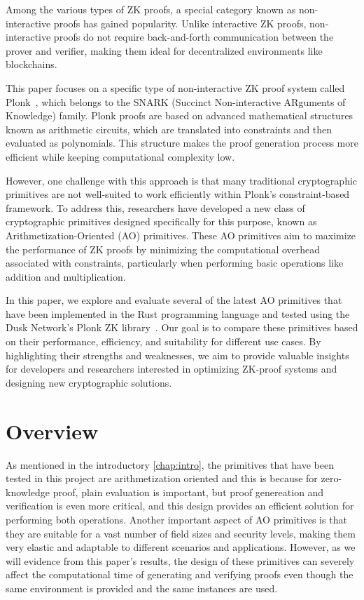 \documentclass[12pt, a4paper]{report}
\begin{document}
Among the various types of ZK proofs, a special category known as non-interactive proofs has gained popularity. Unlike interactive ZK proofs, non-interactive proofs do not require back-and-forth communication between the prover and verifier, making them ideal for decentralized environments like blockchains.

This paper focuses on a specific type of non-interactive ZK proof system called \textsf{Plonk}~\cite{plonk}, which belongs to the SNARK (Succinct Non-interactive ARguments of Knowledge) family. \textsf{Plonk} proofs are based on advanced mathematical structures known as arithmetic circuits, which are translated into constraints and then evaluated as polynomials. This structure makes the proof generation process more efficient while keeping computational complexity low.

However, one challenge with this approach is that many traditional cryptographic primitives are not well-suited to work efficiently within \textsf{Plonk}'s constraint-based framework. To address this, researchers have developed a new class of cryptographic primitives designed specifically for this purpose, known as Arithmetization-Oriented (AO) primitives. These AO primitives aim to maximize the performance of ZK proofs by minimizing the computational overhead associated with constraints, particularly when performing basic operations like addition and multiplication.

In this paper, we explore and evaluate several of the latest AO primitives that have been implemented in the Rust programming language and tested using the Dusk Network's \textsf{Plonk} ZK library~\cite{dusk-plonk}. Our goal is to compare these primitives based on their performance, efficiency, and suitability for different use cases. By highlighting their strengths and weaknesses, we aim to provide valuable insights for developers and researchers interested in optimizing ZK-proof systems and designing new cryptographic solutions.

\chapter{Overview}\label{chap:overview}

As mentioned in the introductory \autoref{chap:intro}, the primitives that have been tested in this project are arithmetization oriented and this is because for zero-knowledge proof, plain evaluation is important, but proof genereation and verification is even more critical, and this design provides an efficient solution for performing both operations.
Another important aspect of AO primitives is that they are suitable for a vast number of field sizes and security levels, making them very elastic and adaptable to different scenarios and applications.
However, as we will evidence from this paper's results, the design of these primitives can severely affect the computational time of generating and verifying proofs even though the same environment is provided and the same instances are used.
\end{document}
